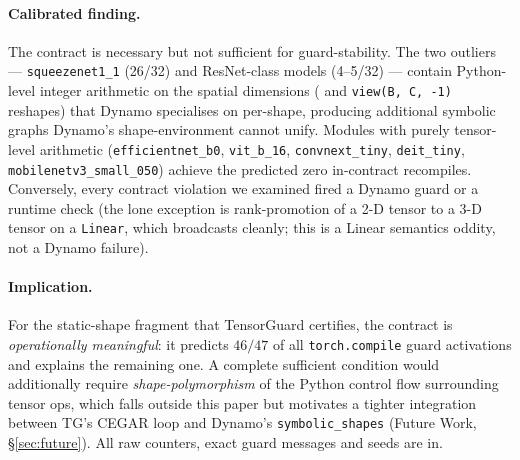 \paragraph{Calibrated finding.}
The contract is necessary but not sufficient for guard-stability. The
two outliers --- \texttt{squeezenet1\_1} (26/32) and ResNet-class models
(4--5/32) --- contain Python-level integer arithmetic on the spatial
dimensions ( and
\texttt{view(B, C, -1)} reshapes) that Dynamo specialises on per-shape,
producing additional symbolic graphs Dynamo's shape-environment cannot
unify. Modules with purely tensor-level arithmetic
(\texttt{efficientnet\_b0}, \texttt{vit\_b\_16}, \texttt{convnext\_tiny},
\texttt{deit\_tiny}, \texttt{mobilenetv3\_small\_050}) achieve the
predicted zero in-contract recompiles. Conversely, every contract
violation we examined fired a Dynamo guard or a runtime check (the lone
exception is rank-promotion of a 2-D tensor to a 3-D tensor on a
\texttt{Linear}, which broadcasts cleanly; this is a Linear semantics
oddity, not a Dynamo failure).

\paragraph{Implication.}
For the static-shape fragment that TensorGuard certifies, the contract is
\emph{operationally meaningful}: it predicts $46/47$ of all
\texttt{torch.compile} guard activations and explains the remaining one.
A complete sufficient condition would additionally require
\emph{shape-polymorphism} of the Python control flow surrounding tensor
ops, which falls outside this paper but motivates a tighter integration
between TG's CEGAR loop and Dynamo's \texttt{symbolic\_shapes} (Future
Work, \S\ref{sec:future}). All raw counters, exact guard messages and
seeds are in.
